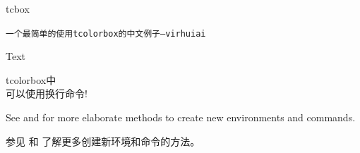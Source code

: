 \begin{docCommand}{tcbox}{}
\begin{带标题示例}{\tt 一个最简单的使用tcolorbox的中文例子\hfill {\rm ---virhuiai}}
\begin{调用系统命令的例子}{}
\usepackage[all]{tcolorbox}

\thispagestyle{empty}
Text  \hfill

\end{调用系统命令的例子}
\end{带标题示例}


\begin{dispExample}

\begin{tcolorbox}tcolorbox中\\可以使用换行命令!\end{tcolorbox}


\end{dispExample}

\end{docCommand}


\begin{marker}
See  and  for more
elaborate methods to create new environments and commands.

参见  和  了解更多创建新环境和命令的方法。%
\end{marker}
